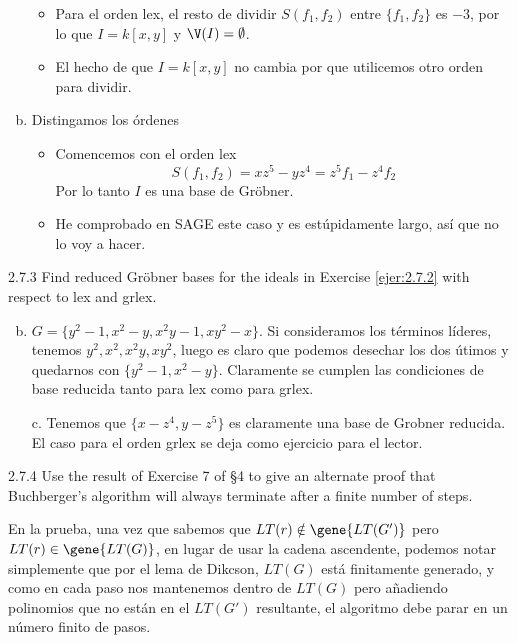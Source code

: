 \documentclass[twoside]{article}
\begin{document}
\begin{solucion}
\begin{enumerate}[a.]
\begin{itemize}
\item Para el orden lex, el resto de dividir $S(f_1,f_2)$ entre $\{f_1,f_2\}$ es $-3$, por lo que $I=k[x,y]$ y $\V(I)=\emptyset$.
\item El hecho de que $I=k[x,y]$ no cambia por que utilicemos otro orden para dividir. 
\end{itemize}
\item Distingamos los órdenes
\begin{itemize}
\item Comencemos con el orden lex
$$
S(f_1,f_2) = xz^5-yz^4 = z^5f_1 -z^4f_2
$$
Por lo tanto $I$ es una base de Gröbner.
\item He comprobado en SAGE este caso y es estúpidamente largo, así que no lo voy a hacer.
\end{itemize}
\end{enumerate}
\end{solucion}
\newpage

\begin{ejercicio}{2.7.3}
Find reduced Gröbner bases for the ideals in Exercise \ref{ejer:2.7.2} with respect to lex and grlex.
\end{ejercicio}
\begin{solucion}
\begin{enumerate}[a.]
\item[]
\item $G=\{y^2-1,x^2-y,x^2y-1,xy^2-x\}$. Si consideramos los términos líderes, tenemos $y^2,x^2,x^2y,xy^2$, luego es claro que podemos desechar los dos útimos y quedarnos con $\{y^2-1,x^2-y\}$. Claramente se cumplen las condiciones de base reducida tanto para lex como para grlex.
\item[c.] Tenemos que $\{x-z^4,y-z^5\}$ es claramente una base de Grobner reducida. El caso para el orden grlex se deja como ejercicio para el lector.
\end{enumerate}
\end{solucion}

\newpage

\begin{ejercicio}{2.7.4}
Use the result of Exercise 7 of §4 to give an alternate proof that Buchberger’s algorithm
will always terminate after a finite number of steps.
\end{ejercicio}
\begin{solucion}
En la prueba, una vez que sabemos que $LT(r)\notin \gene{LT(G')}$ pero $LT(r)\in\gene{LT(G)}$, en lugar de usar la cadena ascendente, podemos notar simplemente que por el lema de Dikcson, $LT(G)$ está finitamente generado, y como en cada paso nos mantenemos dentro de $LT(G)$ pero añadiendo polinomios que no están en el $LT(G')$ resultante, el algoritmo debe parar en un número finito de pasos.
\end{solucion}
\newpage
\end{document}
